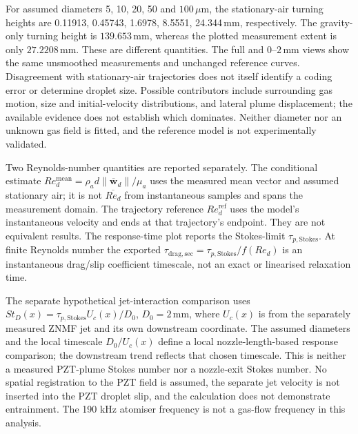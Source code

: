 For assumed diameters 5, 10, 20, 50 and $100\,\mu\mathrm{m}$, the stationary-air
turning heights are 0.11913, 0.45743, 1.6978, 8.5551, 24.344$\,\mathrm{mm}$, respectively.
The gravity-only turning height is $139.653\,\mathrm{mm}$,
whereas the plotted measurement extent is only $27.2208\,\mathrm{mm}$.
These are different quantities. The full and $0$--$2\,\mathrm{mm}$ views
show the same unsmoothed measurements and unchanged reference curves.
Disagreement with stationary-air trajectories does not itself identify a coding
error or determine droplet size. Possible contributors include surrounding gas
motion, size and initial-velocity distributions, and lateral plume displacement;
the available evidence does not establish which dominates. Neither diameter nor
an unknown gas field is fitted, and the reference model is not experimentally validated.

Two Reynolds-number quantities are reported separately. The conditional estimate
$Re_d^{\mathrm{mean}}=\rho_a d\lVert\overline{\boldsymbol w}_d\rVert/\mu_a$
uses the measured mean vector and assumed stationary air; it is not
$\overline{Re_d}$ from instantaneous samples and spans the measurement domain.
The trajectory reference $Re_d^{\mathrm{ref}}$ uses the model's instantaneous
velocity and ends at that trajectory's endpoint. They are not equivalent results.
The response-time plot reports the Stokes-limit $\tau_{p,\mathrm{Stokes}}$.
At finite Reynolds number the exported $\tau_{\mathrm{drag,sec}}=
\tau_{p,\mathrm{Stokes}}/f(Re_d)$ is an instantaneous drag/slip coefficient
timescale, not an exact or linearised relaxation time.

The separate hypothetical jet-interaction comparison uses
$St_D(x)=\tau_{p,\mathrm{Stokes}}U_c(x)/D_0$, $D_0=2\,\mathrm{mm}$,
where $U_c(x)$ is from the separately measured ZNMF jet and its own downstream
coordinate. The assumed diameters and the local timescale $D_0/U_c(x)$ define a
local nozzle-length-based response comparison; the downstream trend reflects
that chosen timescale. This is neither a measured PZT-plume Stokes number nor
a nozzle-exit Stokes number. No spatial registration to the PZT field is assumed,
the separate jet velocity is not inserted into the PZT droplet slip, and the
calculation does not demonstrate entrainment. The 190 kHz atomiser frequency is
not a gas-flow frequency in this analysis.
